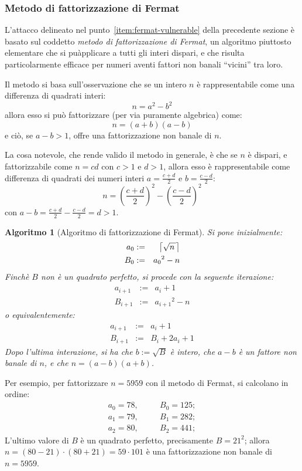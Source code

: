 \documentclass[pdflatex,11pt,a4paper,oneside]{article}
\let\OldEmph\emph
\renewcommand{\emph}[1]{\OldEmph{#1\/}}
\newcommand{\p}[1]{\left({#1}\right)}
\newcommand{\csqrtn}[0]{\big\lceil{\sqrt{n\,}}\big\rceil}
\newtheorem{algorithm}[TheoremLike]{Algoritmo}
\begin{document}
\subsubsection{Metodo di fattorizzazione di Fermat}

L'attacco delineato nel punto~\eqref{item:fermat-vulnerable} della
precedente sezione \`e basato sul coddetto \emph{metodo di fattorizzazione
di Fermat}, un algoritmo piuttosto elementare che si pu\` applicare a tutti
gli interi dispari, e che risulta particolarmente efficace per numeri aventi
fattori non banali ``vicini'' tra loro.

Il metodo si basa sull'osservazione che se un intero $n$ \`e rappresentabile
come una differenza di quadrati interi:
 $$ n = a^2 - b^2 $$
allora esso si pu\`o fattorizzare (per via puramente algebrica) come:
 $$ n = (a + b)(a - b) $$
e ci\`o, se $a - b > 1$, offre una fattorizzazione non banale di $n$.

La cosa notevole, che rende valido il metodo in generale, \`e che se $n$ \`e
dispari, e fattorizzabile come $n = cd$ con $c > 1$ e $d > 1$, allora esso
\`e rappresentabile come differenza di quadrati dei numeri interi
$a = \frac{c + d}{2}$ e $b = \frac{c - d}{2}$:
 $$ n = \p{\frac{c + d}{2}}^2 - \p{\frac{c - d}{2}}^2 $$
con $a - b = \frac{c + d}{2} - \frac{c - d}{2} = d > 1$.

\begin{algorithm}[Algoritmo di fattorizzazione di Fermat]
Si pone inizialmente:
\begin{eqnarray*}
 a_0 & := & \csqrtn\vspace*{1pt}\\
 B_0 & := & {a_0}^2 - n
\end{eqnarray*}
Finch\`e $B$ non \`e un quadrato perfetto, si procede con la seguente
iterazione:
\begin{eqnarray*}
  a_{i+1} & := & a_i + 1 \\
  B_{i+1} & := & {a_{i+1}}^2 - n
\end{eqnarray*}
o equivalentemente:
\begin{eqnarray*}
  a_{i+1} & := & a_i + 1 \\
  B_{i+1} & := & B_i + 2 a_i + 1
\end{eqnarray*}
Dopo l'ultima interazione, si ha che $b := \sqrt{B}$ \`e intero, che
$a - b$ \`e un fattore non banale di $n$, e che $n = (a - b)(a + b)$.
\end{algorithm}

Per esempio, per fattorizzare $n = 5959$ con il metodo di Fermat, si
calcolano in ordine:
\begin{eqnarray*}
a_0 = 78, & \quad & B_0 = 125; \\
a_1 = 79, & \quad & B_1 = 282; \\
a_2 = 80, & \quad & B_2 = 441;
\end{eqnarray*}
L'ultimo valore di $B$ \`e un quadrato perfetto, precisamente $B = 21^2$;
allora $n = (80 - 21)\cdot(80 + 21) = 59 \cdot 101$ \`e una fattorizzazione
non banale di $n = 5959$.
\end{document}
